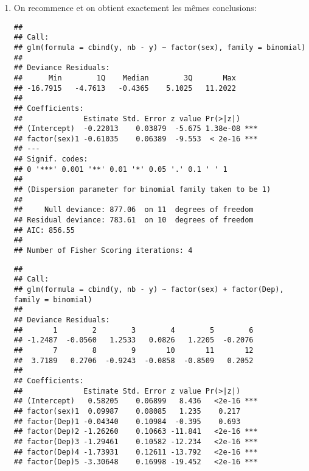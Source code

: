\begin{solution}{6.5}
\begin{enumerate}
\item On recommence et on obtient exactement les mêmes conclusions:
\begin{knitrout}
\color{fgcolor}\begin{kframe}
\begin{alltt}
 \hlkwb{<-} \hlstd{(}\hlopt{-}\hlopt{~}
\end{alltt}
\begin{verbatim}
##
## Call:
## glm(formula = cbind(y, nb - y) ~ factor(sex), family = binomial)
##
## Deviance Residuals:
##      Min        1Q    Median        3Q       Max
## -16.7915   -4.7613   -0.4365    5.1025   11.2022
##
## Coefficients:
##              Estimate Std. Error z value Pr(>|z|)
## (Intercept)  -0.22013    0.03879  -5.675 1.38e-08 ***
## factor(sex)1 -0.61035    0.06389  -9.553  < 2e-16 ***
## ---
## Signif. codes:
## 0 '***' 0.001 '**' 0.01 '*' 0.05 '.' 0.1 ' ' 1
##
## (Dispersion parameter for binomial family taken to be 1)
##
##     Null deviance: 877.06  on 11  degrees of freedom
## Residual deviance: 783.61  on 10  degrees of freedom
## AIC: 856.55
##
## Number of Fisher Scoring iterations: 4
\end{verbatim}
\begin{alltt}
 \hlkwb{<-} \hlstd{(}\hlopt{-}\hlopt{~}\hlopt{+}
\end{alltt}
\begin{verbatim}
##
## Call:
## glm(formula = cbind(y, nb - y) ~ factor(sex) + factor(Dep), family = binomial)
##
## Deviance Residuals:
##       1        2        3        4        5        6
## -1.2487  -0.0560   1.2533   0.0826   1.2205  -0.2076
##       7        8        9       10       11       12
##  3.7189   0.2706  -0.9243  -0.0858  -0.8509   0.2052
##
## Coefficients:
##              Estimate Std. Error z value Pr(>|z|)
## (Intercept)   0.58205    0.06899   8.436   <2e-16 ***
## factor(sex)1  0.09987    0.08085   1.235    0.217
## factor(Dep)1 -0.04340    0.10984  -0.395    0.693
## factor(Dep)2 -1.26260    0.10663 -11.841   <2e-16 ***
## factor(Dep)3 -1.29461    0.10582 -12.234   <2e-16 ***
## factor(Dep)4 -1.73931    0.12611 -13.792   <2e-16 ***
## factor(Dep)5 -3.30648    0.16998 -19.452   <2e-16 ***

\end{verbatim}
\end{kframe}
\end{knitrout}
\end{enumerate}
\end{solution}
